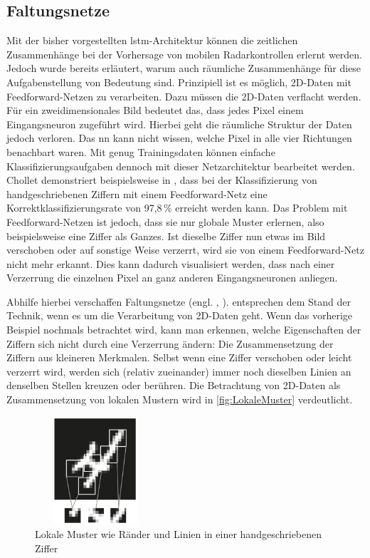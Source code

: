 \subsection{Faltungsnetze}
\label{sec:CNN}

Mit der bisher vorgestellten \acrshort{lstm}-Architektur können die zeitlichen Zusammenhänge bei der Vorhersage von mobilen Radarkontrollen erlernt werden.
Jedoch wurde bereits erläutert, warum auch räumliche Zusammenhänge für diese Aufgabenstellung von Bedeutung sind.
Prinzipiell ist es möglich, 2D-Daten mit Feedforward-Netzen zu verarbeiten.
Dazu müssen die 2D-Daten verflacht werden.
Für ein zweidimensionales Bild bedeutet das, dass jedes Pixel einem Eingangsneuron zugeführt wird.
Hierbei geht die räumliche Struktur der Daten jedoch verloren.
Das \acrshort{nn} kann nicht wissen, welche Pixel in alle vier Richtungen benachbart waren.
Mit genug Trainingsdaten können einfache Klassifizierungsaufgaben dennoch mit dieser Netzarchitektur bearbeitet werden.
Chollet demonstriert beispielsweise in \cite[S. 53]{DeepLearningPythonKeras}, dass bei der Klassifizierung von handgeschriebenen Ziffern mit einem Feedforward-Netz eine Korrektklassifizierungsrate von 97,8\,\% erreicht werden kann.
Das Problem mit Feedforward-Netzen ist jedoch, dass sie nur globale Muster erlernen, also beispielsweise eine Ziffer als Ganzes.
Ist dieselbe Ziffer nun etwas im Bild verschoben oder auf sonstige Weise verzerrt, wird sie von einem Feedforward-Netz nicht mehr erkannt.
Dies kann dadurch visualisiert werden, dass nach einer Verzerrung die einzelnen Pixel an ganz anderen Eingangsneuronen anliegen.

Abhilfe hierbei verschaffen Faltungsnetze (engl. , ).
 entsprechen dem Stand der Technik, wenn es um die Verarbeitung von 2D-Daten geht.
Wenn das vorherige Beispiel nochmals betrachtet wird, kann man erkennen, welche Eigenschaften der Ziffern sich nicht durch eine Verzerrung ändern: Die Zusammensetzung der Ziffern aus kleineren Merkmalen.
Selbst wenn eine Ziffer verschoben oder leicht verzerrt wird, werden sich (relativ zueinander) immer noch dieselben Linien an denselben Stellen kreuzen oder berühren.
Die Betrachtung von 2D-Daten als Zusammensetzung von lokalen Mustern wird in \autoref{fig:LokaleMuster} verdeutlicht.

\begin{figure}[h]
    \centering
    \includegraphics[width=0.4\textwidth,height=4cm,keepaspectratio=true]{content/images/LokaleMuster.png}
    \caption{Lokale Muster wie Ränder und Linien in einer handgeschriebenen Ziffer \cite[Abb. 5.1]{DeepLearningPythonKeras}}
    \label{fig:LokaleMuster}
\end{figure}


